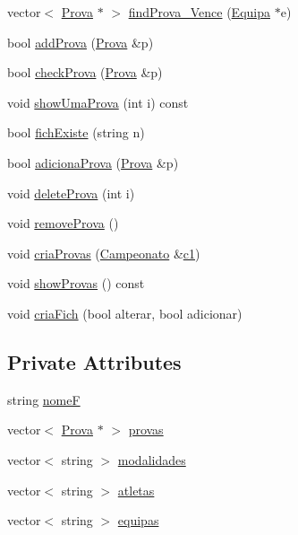 \begin{DoxyCompactItemize}
\item 
vector$<$ \hyperlink{class_prova}{Prova} $\ast$ $>$ \hyperlink{class_calendario_a269e064b1ef6d757eff9b3bd185c6542}{find\+Prova\+\_\+\+Vence} (\hyperlink{class_equipa}{Equipa} $\ast$e)
\item 
bool \hyperlink{class_calendario_a6b17f3bbf936cb19e043e652a3555c33}{add\+Prova} (\hyperlink{class_prova}{Prova} \&p)
\item 
bool \hyperlink{class_calendario_a912aa3dbadbdd82a002ccb251d5281fc}{check\+Prova} (\hyperlink{class_prova}{Prova} \&p)
\item 
void \hyperlink{class_calendario_ae65b9add220bbfdf1f029816333aa656}{show\+Uma\+Prova} (int i) const 
\item 
bool \hyperlink{class_calendario_a84536a437d503ca5c200c103d480b0a8}{fich\+Existe} (string n)
\item 
bool \hyperlink{class_calendario_abf3471ce630be60d0658223017d47ec9}{adiciona\+Prova} (\hyperlink{class_prova}{Prova} \&p)
\item 
void \hyperlink{class_calendario_a433a356a61afcfcb732dd249ee2037d3}{delete\+Prova} (int i)
\item 
void \hyperlink{class_calendario_a81be652b39d3c12492aae44b7d7d5603}{remove\+Prova} ()
\item 
void \hyperlink{class_calendario_a6a97d6bec106682ba1ec68f7b8339be0}{cria\+Provas} (\hyperlink{class_campeonato}{Campeonato} \&\hyperlink{main_8h_a4c89d9526ade3cc45c84a58a6319054a}{c1})
\item 
void \hyperlink{class_calendario_af6bfda8df20c96b8e77773de3da16cee}{show\+Provas} () const 
\item 
void \hyperlink{class_calendario_ad2e3618170e62906c32fd072d75cf1a7}{cria\+Fich} (bool alterar, bool adicionar)
\end{DoxyCompactItemize}
\subsection*{Private Attributes}
\begin{DoxyCompactItemize}
\item 
string \hyperlink{class_calendario_ad14a413cc8b38380f6ea80f921cd16b4}{nome\+F}
\item 
vector$<$ \hyperlink{class_prova}{Prova} $\ast$ $>$ \hyperlink{class_calendario_a1c917a3325a0ebd6cbe186e976326d06}{provas}
\item 
vector$<$ string $>$ \hyperlink{class_calendario_a6a492724444ed6b468fe230d09fd800b}{modalidades}
\item 
vector$<$ string $>$ \hyperlink{class_calendario_abac0d74a48d544302a57fd3857ce3cf2}{atletas}
\item 
vector$<$ string $>$ \hyperlink{class_calendario_a4c49ca003a72d9d1aa32fcef57066467}{equipas}
\end{DoxyCompactItemize}


